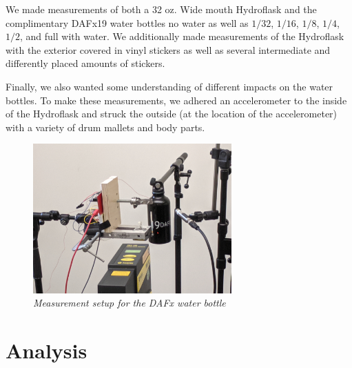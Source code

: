 \documentclass[twoside,a4paper]{article}
\begin{document}
We made measurements of both a 32 oz. Wide mouth Hydroflask and the complimentary DAFx19 water bottles no water as well as $1/32$, $1/16$, $1/8$, $1/4$, $1/2$, and full with water. We additionally made measurements of the Hydroflask with the exterior covered in vinyl stickers as well as several intermediate and differently placed amounts of stickers. 

Finally, we also wanted some understanding of different impacts on the water bottles. To make these measurements, we adhered an accelerometer to the inside of the Hydroflask and struck the outside (at the location of the accelerometer) with a variety of drum mallets and body parts.  



%
%
\begin{figure}[!htb]
    \centering
    \includegraphics[width=3in]{Figures/dafx_measure}
    \caption{\it{Measurement setup for the DAFx water bottle}}
    \label{fig:dafx_measure}
\end{figure}

\section{Analysis} \label{sec:analysis}
%
\end{document}
